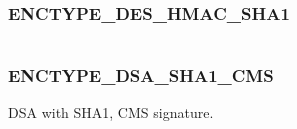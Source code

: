 \documentclass[letterpaper,10pt,english]{sphinxmanual}
\begin{document}
\begin{fulllineitems}
\label{appdev/refs/macros/ENCTYPE_DES_CBC_RAW:ENCTYPE_DES_CBC_RAW}
\end{fulllineitems}


\begin{tabulary}{\linewidth}{|L|L|}
\hline

 & 
\\
\hline\end{tabulary}



\subsubsection{ENCTYPE\_DES\_HMAC\_SHA1}
\label{appdev/refs/macros/ENCTYPE_DES_HMAC_SHA1:enctype-des-hmac-sha1-data}\label{appdev/refs/macros/ENCTYPE_DES_HMAC_SHA1::doc}\label{appdev/refs/macros/ENCTYPE_DES_HMAC_SHA1:enctype-des-hmac-sha1}

\begin{fulllineitems}
\label{appdev/refs/macros/ENCTYPE_DES_HMAC_SHA1:ENCTYPE_DES_HMAC_SHA1}
\end{fulllineitems}


\begin{tabulary}{\linewidth}{|L|L|}
\hline

 & 
\\
\hline\end{tabulary}



\subsubsection{ENCTYPE\_DSA\_SHA1\_CMS}
\label{appdev/refs/macros/ENCTYPE_DSA_SHA1_CMS:enctype-dsa-sha1-cms-data}\label{appdev/refs/macros/ENCTYPE_DSA_SHA1_CMS:enctype-dsa-sha1-cms}\label{appdev/refs/macros/ENCTYPE_DSA_SHA1_CMS::doc}

\begin{fulllineitems}
\label{appdev/refs/macros/ENCTYPE_DSA_SHA1_CMS:ENCTYPE_DSA_SHA1_CMS}
\end{fulllineitems}


DSA with SHA1, CMS signature.
\end{document}

